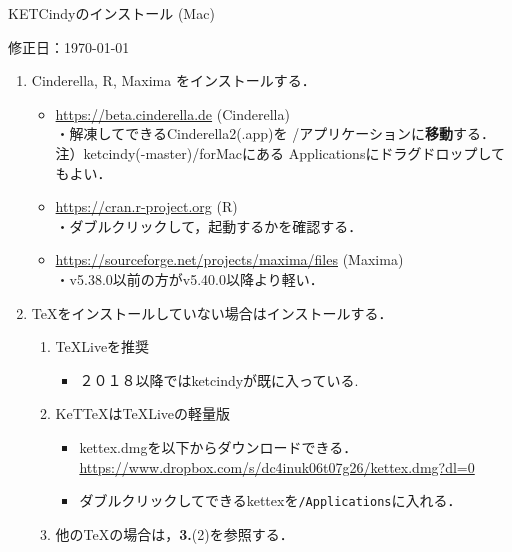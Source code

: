 \documentclass{ujarticle}
\begin{document}
\begin{center}
KETCindyのインストール (Mac)
\end{center}

\hfill 修正日：\today

\begin{enumerate}[\bf\large 1.]
\item Cinderella, R, Maxima をインストールする．
 \begin{itemize}
 \item \url{https://beta.cinderella.de}  (Cinderella)\\
\hspace*{1zw}・解凍してできるCinderella2(.app)を /アプリケーションに{\bf 移動}する．\\
\hspace*{2zw}注）ketcindy(-master)/forMacにある Applicationsにドラグドロップしてもよい．
 \item \url{https://cran.r-project.org}   (R)\\
\hspace*{1zw}・ダブルクリックして，起動するかを確認する．
 \item \url{https://sourceforge.net/projects/maxima/files}  (Maxima)\\
\hspace*{1zw}・v5.38.0以前の方がv5.40.0以降より軽い．
 \end{itemize}
 
\item TeXをインストールしていない場合はインストールする．
 \begin{enumerate}[(1)]
 \item TeXLiveを推奨
    \begin{itemize}
    \item ２０１８以降ではketcindyが既に入っている.
    \end{itemize}
 \item KeTTeXはTeXLiveの軽量版
    \begin{itemize}
    \item kettex.dmgを以下からダウンロードできる．\\
    \hspace*{10mm}\url{https://www.dropbox.com/s/dc4inuk06t07g26/kettex.dmg?dl=0}
    \item ダブルクリックしてできるkettexを\verb|/Applications|に入れる．
    \end{itemize}
 \item 他のTeXの場合は，{\bf 3.}(2)を参照する．
 \end{enumerate}


\end{enumerate}
\end{document}
